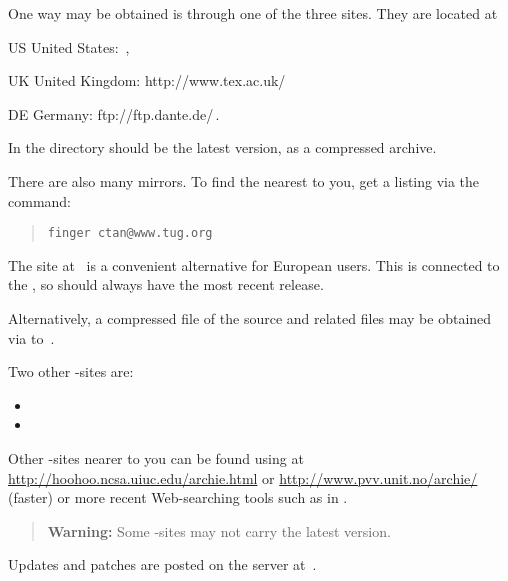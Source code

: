 \begin{changebar}%
One way \latextohtml may be obtained is through one of the three
%
{\CTANtug{}} sites.
They are located at
\begin{htmllist}
\item [US ]
United States:
\htmladdnormallinkfoot{\CTANtug{}}{\CTANtug{\CTANA}}\,,
\item [UK ]
United Kingdom:
%
{http://www.tex.ac.uk/\CTANA}
\item [DE ]
Germany:
%
{ftp://ftp.dante.de/\CTANA}\,.
\end{htmllist}
In the directory \htmladdnormallink{\CTANA/}{\CTANtug{\CTANA}} 
should be the latest version, as a compressed archive.

\smallskip\noindent
There are also many mirrors.
To find the nearest to you, get a listing via the command:
\begin{quote}
\texttt{finger ctan@www.tug.org}
\end{quote}

\begin{changebar}\noindent
The site at \CVSsite\ is a convenient alternative for European users.
This is connected to the ,
so should always have the most recent release.
\end{changebar}

%
\smallskip\noindent
Alternatively, a compressed  file of the source and related files 
may be obtained via  to \sourceA\,.

\smallskip\noindent
Two other -sites are:
\begin{itemize}
\item \sourceB{}
\item \sourceC{}
\end{itemize}

%
%
\smallskip\noindent
Other -sites nearer to you can be found using  at 
\url{http://hoohoo.ncsa.uiuc.edu/archie.html} or 
\url{http://www.pvv.unit.no/archie/} (faster) 
or more recent Web-searching tools such as 
in .
\begin{quote}
\textbf{Warning: }%
Some -sites may not carry the latest version.
\end{quote}

%
\smallskip\noindent
Updates and patches are posted on the \latextohtml{} server at \patches\,.
\end{changebar}

